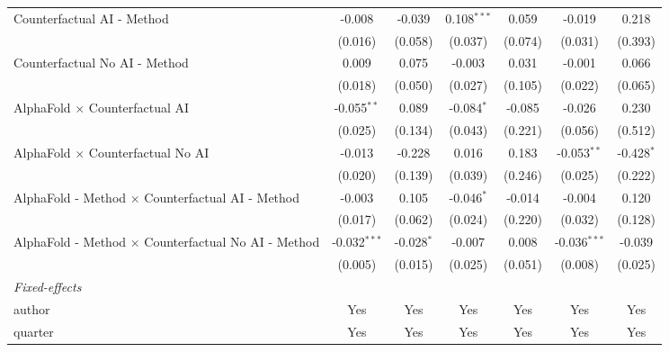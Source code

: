 \begin{tabular}{lcccccc}
   Counterfactual AI - Method                                 & -0.008         & -0.039       & 0.108$^{***}$ & 0.059   & -0.019         & 0.218\\   
                                                              & (0.016)        & (0.058)      & (0.037)       & (0.074) & (0.031)        & (0.393)\\   
   Counterfactual No AI - Method                              & 0.009          & 0.075        & -0.003        & 0.031   & -0.001         & 0.066\\   
                                                              & (0.018)        & (0.050)      & (0.027)       & (0.105) & (0.022)        & (0.065)\\   
   AlphaFold $\times$ Counterfactual AI                       & -0.055$^{**}$  & 0.089        & -0.084$^{*}$  & -0.085  & -0.026         & 0.230\\   
                                                              & (0.025)        & (0.134)      & (0.043)       & (0.221) & (0.056)        & (0.512)\\   
   AlphaFold $\times$ Counterfactual No AI                    & -0.013         & -0.228       & 0.016         & 0.183   & -0.053$^{**}$  & -0.428$^{*}$\\   
                                                              & (0.020)        & (0.139)      & (0.039)       & (0.246) & (0.025)        & (0.222)\\   
   AlphaFold - Method $\times$ Counterfactual AI - Method     & -0.003         & 0.105        & -0.046$^{*}$  & -0.014  & -0.004         & 0.120\\   
                                                              & (0.017)        & (0.062)      & (0.024)       & (0.220) & (0.032)        & (0.128)\\   
   AlphaFold - Method $\times$ Counterfactual No AI - Method  & -0.032$^{***}$ & -0.028$^{*}$ & -0.007        & 0.008   & -0.036$^{***}$ & -0.039\\   
                                                              & (0.005)        & (0.015)      & (0.025)       & (0.051) & (0.008)        & (0.025)\\   
   \midrule
   \emph{Fixed-effects}\\
   author                                                     & Yes            & Yes          & Yes           & Yes     & Yes            & Yes\\  
   quarter                                                    & Yes            & Yes          & Yes           & Yes     & Yes            & Yes\\  

\end{tabular}
